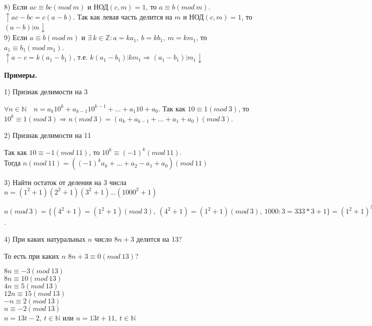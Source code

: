 \documentclass{article}
\begin{document}
    8) Если \(ac \equiv bc (mod\ m)\) и \(\textrm{НОД}(c,m) = 1\), то \(a \equiv b (mod\ m)\).\\
    \(\uparrow ac - bc = c(a - b)\). Так как левая часть делится на \(m\) и \(\textrm{НОД}(c,m) = 1\), то \((a - b) \vdots m \downarrow \)\\
    9) Если \(a \equiv b (mod\ m)\) и \(\exists\ k \in \mathbb{Z}: a = ka_1,\ b = kb_1,\ m = km_1\), то \(a_1 \equiv b_1 (mod\ m_1)\).\\
    \( \uparrow a - c = k(a_1 - b_1) \), т.е. \( k(a_1 - b_1) \vdots km_1 \Rightarrow (a_1 - b_1) \vdots m_1 \downarrow \)

    \textbf{Примеры.}

    1) Признак делимости на 3

    \( \forall n \in \mathbb{N}\quad n = a_k10^k + a_{k - 1}10^{k - 1} + ... + a_1 10 + a_0 \). Так как \(10 \equiv 1 (mod\ 3)\), то \(10^k \equiv 1 (mod\ 3) \Rightarrow n(mod\ 3) = (a_k + a_{k - 1} + ... + a_1 + a_0)(mod\ 3)\).

    2) Признак делимости на 11

    Так как \( 10 \equiv -1 (mod\ 11) \), то \( 10^k \equiv (-1)^k(mod\ 11) \).\\
    Тогда \( n(mod\ 11) = ((-1)^ka_k + ... + a_2 - a_1 + a_0)(mod\ 11) \)

    3) Найти остаток от деления на 3 числа \( n = (1^2 + 1)(2^2 + 1)(3^2 + 1)...(1000^2 + 1) \)

    \( n(mod\ 3) = \{(4^2 + 1) = (1^2 + 1)(mod\ 3),\ (4^2 + 1) = (1^2 + 1)(mod\ 3),\ 1000:3 = 333*3 + 1 \} = (1^2 + 1)^{334}(2^2 + 1)^{333}(3^2 + 1)^{333}(mod\ 3) \equiv (2)^{334}(2)^{333}(1)^{333}(mod\ 3) \equiv (2)^{667}(mod\ 3) \equiv (-1)^{667}(mod\ 3) \equiv -1(mod\ 3) \equiv 2(mod\ 3) \).

    4) При каких натуральных \(n\) число \(8n + 3\) делится на 13?

    То есть при каких \(n\) \(8n + 3 \equiv 0(mod\ 13)\)?

    \( 8n \equiv -3(mod\ 13) \)\\
    \( 8n \equiv 10(mod\ 13) \)\\
    \( 4n \equiv 5(mod\ 13) \)\\
    \( 12n \equiv 15(mod\ 13) \)\\
    \( -n \equiv 2(mod\ 13) \)\\
    \( n \equiv -2(mod\ 13) \)\\
    \( n = 13t - 2,\ t \in \mathbb{N} \) или \( n = 13t + 11,\ t \in \mathbb{N} \)
    
\end{document}
